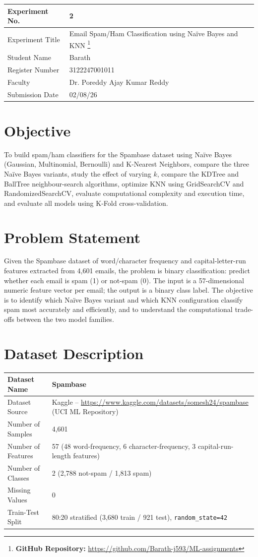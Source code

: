 \documentclass[12pt,a4paper]{article}
\begin{document}
\begin{tabular}{|p{4cm}|p{11cm}|}
\hline
Experiment No. & 2 \\ \hline
Experiment Title & Email Spam/Ham Classification using Na\"ive Bayes and KNN
\footnote{\textbf{GitHub Repository: }\url{https://github.com/Barath-j593/ML-assignments}}\\ \hline
Student Name & Barath \\ \hline
Register Number & 3122247001011 \\ \hline
Faculty & Dr. Poreddy Ajay Kumar Reddy \\ \hline
Submission Date & 02/08/26 \\ \hline
\end{tabular}

\section{Objective}
To build spam/ham classifiers for the Spambase dataset using Na\"ive Bayes (Gaussian,
Multinomial, Bernoulli) and K-Nearest Neighbors, compare the three Na\"ive Bayes variants,
study the effect of varying $k$, compare the KDTree and BallTree neighbour-search algorithms,
optimize KNN using GridSearchCV and RandomizedSearchCV, evaluate computational complexity and
execution time, and evaluate all models using K-Fold cross-validation.

\section{Problem Statement}
Given the Spambase dataset of word/character frequency and capital-letter-run features
extracted from 4,601 emails, the problem is binary classification: predict whether each email
is spam (1) or not-spam (0). The input is a 57-dimensional numeric feature vector per email;
the output is a binary class label. The objective is to identify which Na\"ive Bayes variant
and which KNN configuration classify spam most accurately and efficiently, and to understand
the computational trade-offs between the two model families.

\section{Dataset Description}
\begin{longtable}{|p{6cm}|p{8cm}|}
\hline
Dataset Name & Spambase \\ \hline
Dataset Source & Kaggle -- \url{https://www.kaggle.com/datasets/somesh24/spambase} (UCI ML Repository) \\ \hline
Number of Samples & 4,601 \\ \hline
Number of Features & 57 (48 word-frequency, 6 character-frequency, 3 capital-run-length features) \\ \hline
Number of Classes & 2 (2,788 not-spam / 1,813 spam) \\ \hline
Missing Values & 0 \\ \hline
Train-Test Split & 80:20 stratified (3,680 train / 921 test), \texttt{random\_state=42} \\ \hline
\end{longtable}
\end{document}
